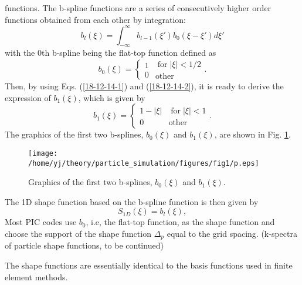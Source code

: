 \documentclass{article}
\newcommand{\tmop}[1]{\ensuremath{\operatorname{#1}}}
\begin{document}
functions. The b-spline functions are a series of consecutively higher order
functions obtained from each other by integration:
\begin{equation}
  \label{18-12-14-1} b_l (\xi) = \int_{- \infty}^{\infty} b_{l - 1} (\xi') b_0
  (\xi - \xi') d \xi'
\end{equation}
with the 0th b-spline being the flat-top function defined as
\begin{equation}
  \label{18-12-14-2} b_0 (\xi) = \left\{ \begin{array}{l}
    1\\
    0
  \end{array} \right.  \begin{array}{l}
    \tmop{for} | \xi | < 1 / 2\\
    \tmop{other}
  \end{array} .
\end{equation}
Then, by using Eqs. (\ref{18-12-14-1}) and (\ref{18-12-14-2}), it is ready to
derive the expression of $b_1 (\xi)$, which is given by
\begin{equation}
  b_1 (\xi) = \left\{ \begin{array}{l}
    1 - | \xi | \\
    0
  \end{array} \right.  \begin{array}{l}
    \tmop{for} | \xi | < 1\\
    \tmop{other}
  \end{array} .
\end{equation}
The graphics of the first two b-splines, $b_0 (\xi)$ and $b_1 (\xi)$, are
shown in Fig. \ref{17-6-25-p1}.

\begin{figure}[h]
  \texttt{[image: /home/yj/theory/particle\_simulation/figures/fig1/p.eps]}
  \caption{\label{17-6-25-p1}Graphics of the first two b-splines, $b_0 (\xi)$
  and $b_1 (\xi)$.}
\end{figure}

The 1D shape function based on the b-spline function is then given by
\begin{equation}
  \label{3-23-p1} S_{1 D} (\xi) = b_l (\xi),
\end{equation}
Most PIC codes use $b_0$, i.e, the flat-top function, as the shape function
and choose the support of the shape function $\Delta_p$ equal to the grid
spacing. (k-spectra of particle shape functions, to be continued)

The shape functions are essentially identical to the basis functions used in
finite element methods.
\end{document}
